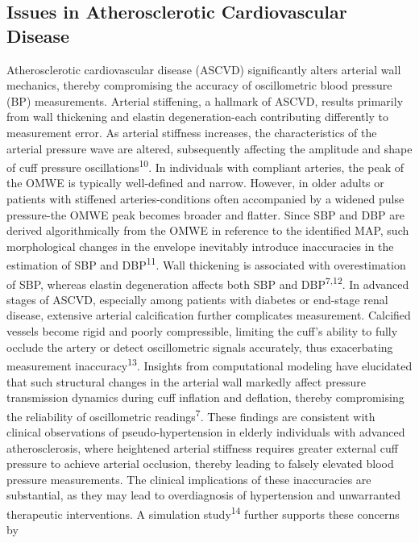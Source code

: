 \documentclass[
  12pt,
  letterpaper,
  openany,
  oneside]{book}
\begin{document}
\subsection{Issues in Atherosclerotic Cardiovascular
Disease}\label{issues-in-atherosclerotic-cardiovascular-disease}

Atherosclerotic cardiovascular disease (ASCVD) significantly alters
arterial wall mechanics, thereby compromising the accuracy of
oscillometric blood pressure (BP) measurements. Arterial stiffening, a
hallmark of ASCVD, results primarily from wall thickening and elastin
degeneration-each contributing differently to measurement error. As
arterial stiffness increases, the characteristics of the arterial
pressure wave are altered, subsequently affecting the amplitude and
shape of cuff pressure oscillations\textsuperscript{10}. In individuals
with compliant arteries, the peak of the OMWE is typically well-defined
and narrow. However, in older adults or patients with stiffened
arteries-conditions often accompanied by a widened pulse pressure-the
OMWE peak becomes broader and flatter. Since SBP and DBP are derived
algorithmically from the OMWE in reference to the identified MAP, such
morphological changes in the envelope inevitably introduce inaccuracies
in the estimation of SBP and DBP\textsuperscript{11}. Wall thickening is
associated with overestimation of SBP, whereas elastin degeneration
affects both SBP and DBP\textsuperscript{7,12}. In advanced stages of
ASCVD, especially among patients with diabetes or end-stage renal
disease, extensive arterial calcification further complicates
measurement. Calcified vessels become rigid and poorly compressible,
limiting the cuff's ability to fully occlude the artery or detect
oscillometric signals accurately, thus exacerbating measurement
inaccuracy\textsuperscript{13}. Insights from computational modeling
have elucidated that such structural changes in the arterial wall
markedly affect pressure transmission dynamics during cuff inflation and
deflation, thereby compromising the reliability of oscillometric
readings\textsuperscript{7}. These findings are consistent with clinical
observations of pseudo-hypertension in elderly individuals with advanced
atherosclerosis, where heightened arterial stiffness requires greater
external cuff pressure to achieve arterial occlusion, thereby leading to
falsely elevated blood pressure measurements. The clinical implications
of these inaccuracies are substantial, as they may lead to overdiagnosis
of hypertension and unwarranted therapeutic interventions. A simulation
study\textsuperscript{14} further supports these concerns by
\end{document}
